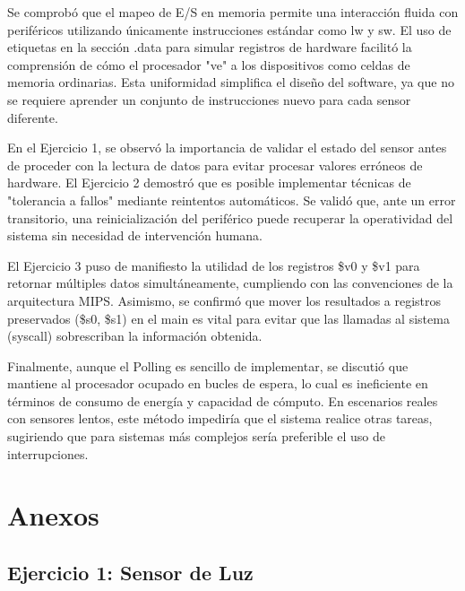 \documentclass[12pt,a4paper]{article}
\begin{document}
Se comprobó que el mapeo de E/S en memoria permite una interacción fluida con periféricos utilizando únicamente instrucciones estándar como lw y sw. El uso de etiquetas en la sección .data para simular registros de hardware facilitó la comprensión de cómo el procesador "ve" a los dispositivos como celdas de memoria ordinarias. Esta uniformidad simplifica el diseño del software, ya que no se requiere aprender un conjunto de instrucciones nuevo para cada sensor diferente.

En el Ejercicio 1, se observó la importancia de validar el estado del sensor antes de proceder con la lectura de datos para evitar procesar valores erróneos de hardware. El Ejercicio 2 demostró que es posible implementar técnicas de "tolerancia a fallos" mediante reintentos automáticos. Se validó que, ante un error transitorio, una reinicialización del periférico puede recuperar la operatividad del sistema sin necesidad de intervención humana.

El Ejercicio 3 puso de manifiesto la utilidad de los registros \$v0 y \$v1 para retornar múltiples datos simultáneamente, cumpliendo con las convenciones de la arquitectura MIPS. Asimismo, se confirmó que mover los resultados a registros preservados (\$s0, \$s1) en el main es vital para evitar que las llamadas al sistema (syscall) sobrescriban la información obtenida.

Finalmente, aunque el Polling es sencillo de implementar, se discutió que mantiene al procesador ocupado en bucles de espera, lo cual es ineficiente en términos de consumo de energía y capacidad de cómputo. En escenarios reales con sensores lentos, este método impediría que el sistema realice otras tareas, sugiriendo que para sistemas más complejos sería preferible el uso de interrupciones.

\section{Anexos}

\subsection{Ejercicio 1: Sensor de Luz}
\end{document}
